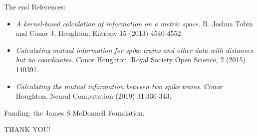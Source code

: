 \documentclass{beamer}
\begin{document}
\begin{frame}{The end}
  \color{black}
  References:
  \begin{itemize}
  \item \textsl{A kernel-based calculation of information on a metric space.}
    R. Joshua Tobin and Conor J. Houghton, Entropy 15 (2013)
    4540-4552.
  \item \textsl{Calculating mutual information for spike trains and other data
    with distances but no coordinates.} Conor Houghton, Royal Society
    Open Science, 2 (2015) 140391.
  \item \textsl{Calculating the mutual information between two spike trains.} Conor Houghton, Neural Computation (2019) 31:330-343.
    \end{itemize}
  Funding: the James S McDonnell Foundation.
  \begin{center}
THANK YOU!
\end{center}
\end{frame}
\end{document}
